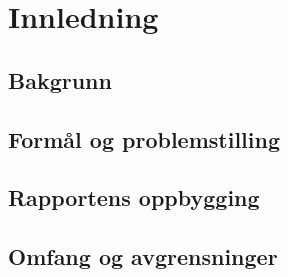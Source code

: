 \chapter{Innledning}
    

    
     
     
     \section{Bakgrunn}
     

   
    


\section{Formål og problemstilling}




\section{Rapportens oppbygging}





\section{Omfang og avgrensninger}



